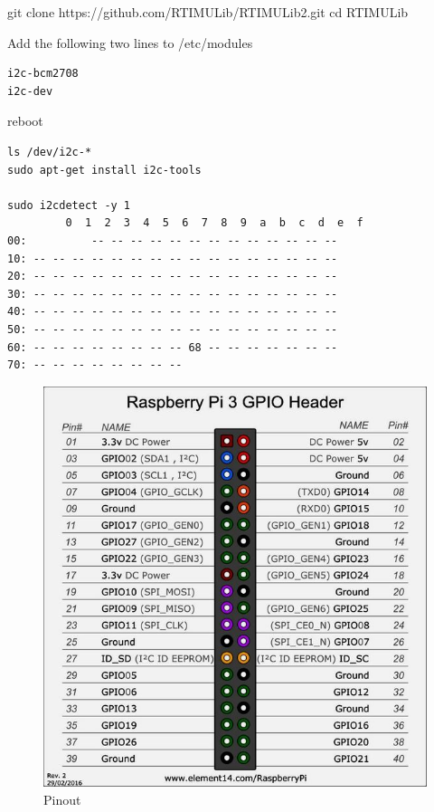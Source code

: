 git clone https://github.com/RTIMULib/RTIMULib2.git cd RTIMULib

Add the following two lines to /etc/modules

\begin{verbatim}
i2c-bcm2708
i2c-dev
\end{verbatim}

reboot

\begin{verbatim}
ls /dev/i2c-*
sudo apt-get install i2c-tools

sudo i2cdetect -y 1
         0  1  2  3  4  5  6  7  8  9  a  b  c  d  e  f
00:          -- -- -- -- -- -- -- -- -- -- -- -- -- 
10: -- -- -- -- -- -- -- -- -- -- -- -- -- -- -- -- 
20: -- -- -- -- -- -- -- -- -- -- -- -- -- -- -- -- 
30: -- -- -- -- -- -- -- -- -- -- -- -- -- -- -- -- 
40: -- -- -- -- -- -- -- -- -- -- -- -- -- -- -- -- 
50: -- -- -- -- -- -- -- -- -- -- -- -- -- -- -- -- 
60: -- -- -- -- -- -- -- -- 68 -- -- -- -- -- -- -- 
70: -- -- -- -- -- -- -- --
\end{verbatim}

\begin{figure}
\centering
\includegraphics{images/rasp3.jpg}
\caption{Pinout}
\end{figure}

